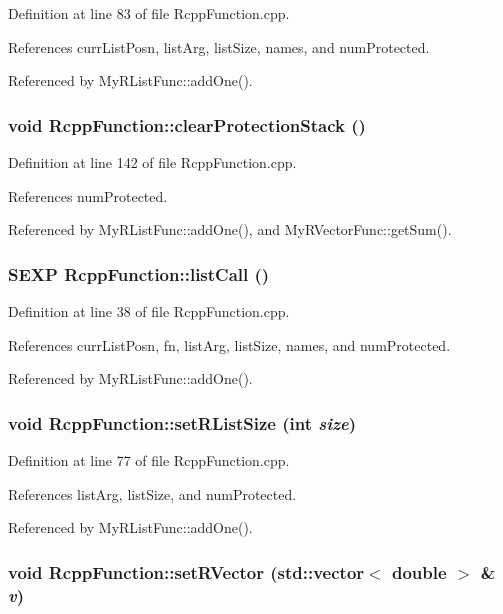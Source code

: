 Definition at line 83 of file RcppFunction.cpp.

References currListPosn, listArg, listSize, names, and numProtected.

Referenced by MyRListFunc::addOne().\hypertarget{classRcppFunction_a689c914636f0f0e86b90da4425c6e6a3}{
\subsubsection[{clearProtectionStack}]{\setlength{\rightskip}{0pt plus 5cm}void RcppFunction::clearProtectionStack ()}}
\label{classRcppFunction_a689c914636f0f0e86b90da4425c6e6a3}


Definition at line 142 of file RcppFunction.cpp.

References numProtected.

Referenced by MyRListFunc::addOne(), and MyRVectorFunc::getSum().\hypertarget{classRcppFunction_a0cc9d29ab7db552494dddefaa78e6578}{
\subsubsection[{listCall}]{\setlength{\rightskip}{0pt plus 5cm}SEXP RcppFunction::listCall ()}}
\label{classRcppFunction_a0cc9d29ab7db552494dddefaa78e6578}


Definition at line 38 of file RcppFunction.cpp.

References currListPosn, fn, listArg, listSize, names, and numProtected.

Referenced by MyRListFunc::addOne().\hypertarget{classRcppFunction_af3dbcf8dcfbdfc49ef566b5efd0ad978}{
\subsubsection[{setRListSize}]{\setlength{\rightskip}{0pt plus 5cm}void RcppFunction::setRListSize (int {\em size})}}
\label{classRcppFunction_af3dbcf8dcfbdfc49ef566b5efd0ad978}


Definition at line 77 of file RcppFunction.cpp.

References listArg, listSize, and numProtected.

Referenced by MyRListFunc::addOne().\hypertarget{classRcppFunction_a482df5aa5e2a98d52c9a79cf3ab31c67}{
\subsubsection[{setRVector}]{\setlength{\rightskip}{0pt plus 5cm}void RcppFunction::setRVector (std::vector$<$ double $>$ \& {\em v})}}
\label{classRcppFunction_a482df5aa5e2a98d52c9a79cf3ab31c67}


